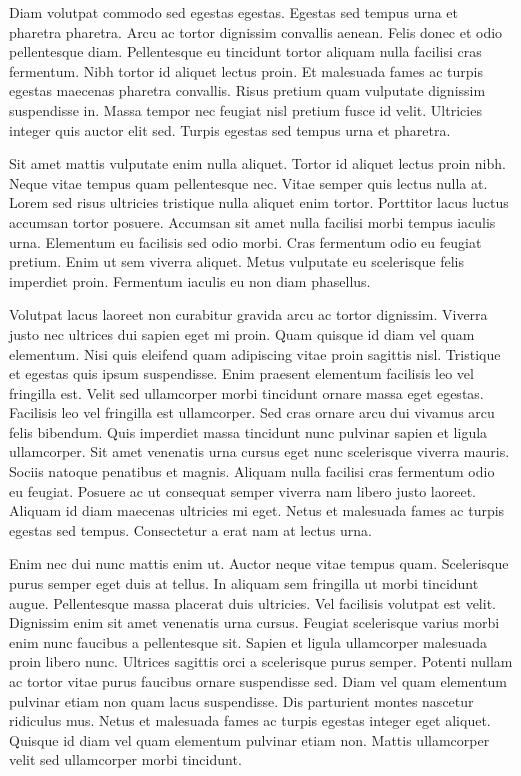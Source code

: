 \documentclass[11pt,a4paper]{article}
\begin{document}
Diam volutpat commodo sed egestas egestas. Egestas sed tempus urna et pharetra pharetra. Arcu ac tortor dignissim convallis aenean. Felis donec et odio pellentesque diam. Pellentesque eu tincidunt tortor aliquam nulla facilisi cras fermentum. Nibh tortor id aliquet lectus proin. Et malesuada fames ac turpis egestas maecenas pharetra convallis. Risus pretium quam vulputate dignissim suspendisse in. Massa tempor nec feugiat nisl pretium fusce id velit. Ultricies integer quis auctor elit sed. Turpis egestas sed tempus urna et pharetra.

Sit amet mattis vulputate enim nulla aliquet. Tortor id aliquet lectus proin nibh. Neque vitae tempus quam pellentesque nec. Vitae semper quis lectus nulla at. Lorem sed risus ultricies tristique nulla aliquet enim tortor. Porttitor lacus luctus accumsan tortor posuere. Accumsan sit amet nulla facilisi morbi tempus iaculis urna. Elementum eu facilisis sed odio morbi. Cras fermentum odio eu feugiat pretium. Enim ut sem viverra aliquet. Metus vulputate eu scelerisque felis imperdiet proin. Fermentum iaculis eu non diam phasellus.

Volutpat lacus laoreet non curabitur gravida arcu ac tortor dignissim. Viverra justo nec ultrices dui sapien eget mi proin. Quam quisque id diam vel quam elementum. Nisi quis eleifend quam adipiscing vitae proin sagittis nisl. Tristique et egestas quis ipsum suspendisse. Enim praesent elementum facilisis leo vel fringilla est. Velit sed ullamcorper morbi tincidunt ornare massa eget egestas. Facilisis leo vel fringilla est ullamcorper. Sed cras ornare arcu dui vivamus arcu felis bibendum. Quis imperdiet massa tincidunt nunc pulvinar sapien et ligula ullamcorper. Sit amet venenatis urna cursus eget nunc scelerisque viverra mauris. Sociis natoque penatibus et magnis. Aliquam nulla facilisi cras fermentum odio eu feugiat. Posuere ac ut consequat semper viverra nam libero justo laoreet. Aliquam id diam maecenas ultricies mi eget. Netus et malesuada fames ac turpis egestas sed tempus. Consectetur a erat nam at lectus urna.

Enim nec dui nunc mattis enim ut. Auctor neque vitae tempus quam. Scelerisque purus semper eget duis at tellus. In aliquam sem fringilla ut morbi tincidunt augue. Pellentesque massa placerat duis ultricies. Vel facilisis volutpat est velit. Dignissim enim sit amet venenatis urna cursus. Feugiat scelerisque varius morbi enim nunc faucibus a pellentesque sit. Sapien et ligula ullamcorper malesuada proin libero nunc. Ultrices sagittis orci a scelerisque purus semper. Potenti nullam ac tortor vitae purus faucibus ornare suspendisse sed. Diam vel quam elementum pulvinar etiam non quam lacus suspendisse. Dis parturient montes nascetur ridiculus mus. Netus et malesuada fames ac turpis egestas integer eget aliquet. Quisque id diam vel quam elementum pulvinar etiam non. Mattis ullamcorper velit sed ullamcorper morbi tincidunt.
\end{document}
